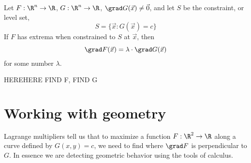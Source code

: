 \documentclass{ximera}
\begin{document}
\begin{theorem}
  Let $F:\R^n\to\R$, $G:\R^n\to\R$, $\grad G(\vec{x}) \ne \vec{0}$,
  and let $S$ be the constraint, or level set,
  \[
  S = \{\vec{x}: G(\vec{x}) = c\}
  \]
  If $F$ has extrema when constrained to $S$ at $\vec{x}$, then
  \[
  \grad F(\vec{x}) = \lambda \cdot \grad G(\vec{x})
  \]
  for some number $\lambda$.
\end{theorem}


HEREHERE FIND F, FIND G


  


\section{Working with geometry}

Lagrange multipliers tell us that to maximize a function $F:\R^2\to\R$
along a curve defined by $G(x,y) = c$, we need to find where $\grad F$
is perpendicular to $G$. In essence we are detecting geometric
behavior using the tools of calculus.
\end{document}
